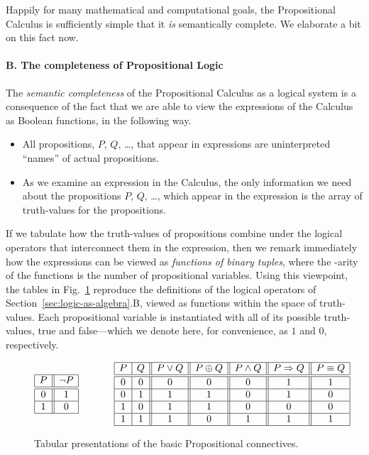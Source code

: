 \bigskip

Happily for many mathematical and computational goals, the Propositional Calculus is sufficiently simple that it {\em is} semantically complete.  We elaborate a bit on this fact now.

\paragraph{B. The completeness of Propositional Logic}

The {\em semantic completeness} of the Propositional Calculus as a logical system is a consequence of the fact that we are able to view the expressions of the Calculus as Boolean functions, in the following way.
\begin{itemize}
\item
All propositions, $P$, $Q$, \ldots, that appear in expressions are uninterpreted ``names'' of actual propositions.
\item
As we examine an expression in the Calculus, the only information we need about the propositions $P$, $Q$, \ldots, which appear in the expression is the array of truth-values for the propositions.
\end{itemize}
If we tabulate how the truth-values of propositions combine under the logical operators that interconnect them in the expression, then we remark immediately how the expressions can be viewed as {\em functions of binary tuples}, where the -arity of the functions is the number of propositional variables.  Using this viewpoint, the tables in Fig.~\ref{fig:defns-via-tables} reproduce the definitions of the logical operators of Section~\ref{sec:logic-as-algebra}.B, viewed as functions within the space of truth-values.  Each propositional variable is instantiated with all of its possible truth-values, {\sc true} and {\sc false}---which we denote here, for convenience, as $1$ and $0$, respectively.
\begin{figure}[hbt]
\[
\begin{array}{|c||c|}
\hline
P & \neg P \\
\hline
\hline
0 & 1 \\
\hline
1 & 0 \\
\hline
\end{array}
\hspace*{.5in}
\begin{array}{|c|c||c||c||c||c||c|}
\hline
P & Q & P \vee Q  & P \oplus Q & P \wedge Q & P \Rightarrow Q & P \equiv Q  \\
\hline
\hline
0 & 0 & 0 & 0 & 0 & 1 & 1 \\
\hline
0 & 1 & 1 & 1 & 0 & 1 & 0 \\
\hline
1 & 0 & 1 & 1 & 0 & 0 & 0 \\
\hline
1 & 1 & 1 & 0 & 1 & 1 & 1 \\
\hline
\end{array}
\]
\caption{Tabular presentations of the basic Propositional connectives.
\label{fig:defns-via-tables}}
\end{figure}
